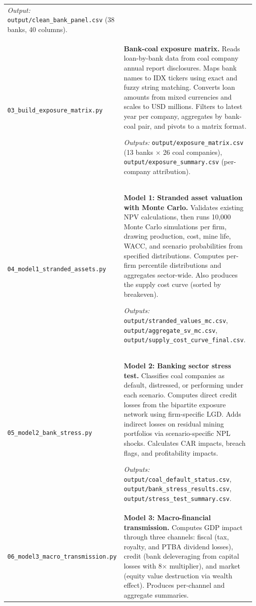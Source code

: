 \begin{longtable}{p{4cm}p{9.5cm}}
\textit{Output:} \texttt{output/clean\_bank\_panel.csv} (38 banks, 40 columns). \\[8pt]

\texttt{03\_build\_exposure\_matrix.py} &
\textbf{Bank-coal exposure matrix.} Reads loan-by-bank data from coal company annual report disclosures. Maps bank names to IDX tickers using exact and fuzzy string matching. Converts loan amounts from mixed currencies and scales to USD millions. Filters to latest year per company, aggregates by bank-coal pair, and pivots to a matrix format.

\textit{Outputs:} \texttt{output/exposure\_matrix.csv} (13 banks $\times$ 26 coal companies), \texttt{output/exposure\_summary.csv} (per-company attribution). \\[8pt]

\texttt{04\_model1\_stranded\_assets.py} &
\textbf{Model 1: Stranded asset valuation with Monte Carlo.} Validates existing NPV calculations, then runs 10,000 Monte Carlo simulations per firm, drawing production, cost, mine life, WACC, and scenario probabilities from specified distributions. Computes per-firm percentile distributions and aggregates sector-wide. Also produces the supply cost curve (sorted by breakeven).

\textit{Outputs:} \texttt{output/stranded\_values\_mc.csv}, \texttt{output/aggregate\_sv\_mc.csv}, \texttt{output/supply\_cost\_curve\_final.csv}. \\[8pt]

\texttt{05\_model2\_bank\_stress.py} &
\textbf{Model 2: Banking sector stress test.} Classifies coal companies as default, distressed, or performing under each scenario. Computes direct credit losses from the bipartite exposure network using firm-specific LGD. Adds indirect losses on residual mining portfolios via scenario-specific NPL shocks. Calculates CAR impacts, breach flags, and profitability impacts.

\textit{Outputs:} \texttt{output/coal\_default\_status.csv}, \texttt{output/bank\_stress\_results.csv}, \texttt{output/stress\_test\_summary.csv}. \\[8pt]

\texttt{06\_model3\_macro\_transmission.py} &
\textbf{Model 3: Macro-financial transmission.} Computes GDP impact through three channels: fiscal (tax, royalty, and PTBA dividend losses), credit (bank deleveraging from capital losses with 8$\times$ multiplier), and market (equity value destruction via wealth effect). Produces per-channel and aggregate summaries.


\end{longtable}
